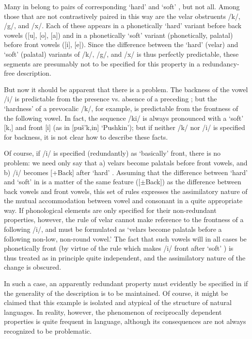 Many  in  belong to pairs of corresponding `hard' and
`soft' , but not all.  Among those that are not
contrastively paired in this way are the velar obstruents /k/, /g/,
and /x/. Each of these appears in a phonetically `hard' variant before
back vowels ([u], [o], [a]) and in a phonetically `soft' variant
(phonetically, palatal) before front vowels ([i], [e]).  Since the
difference between the `hard' (velar) and `soft' (palatal) variants of
/k/, /g/, and /x/ is thus perfectly predictable, these segments are
presumably not to be specified for this property in a redundancy-free
description.

But now it should be apparent that there is a problem.  The backness
of the vowel /i/ is predictable from the presence vs.  absence of a
preceding ; but the `hardness' of a prevocalic /k/, for
example, is predictable from the frontness of the following vowel.  In
fact, the sequence /ki/ is always pronounced with a `soft' [k,] and
front [i] (as in [puš'k,in] `Pushkin'); but if neither /k/ nor /i/
is specified for backness, it is not clear how to describe these
facts.

Of course, if /i/ is specified (redundantly) as `basically' front,
there is no problem: we need only say that a) velars become palatals
before front vowels, and b) /i/ becomes [+Back] after `hard'
.  Assuming that the difference between `hard' and `soft'
 in  is a matter of the same feature ([$\pm$Back]) as
the difference between back vowels and front vowels, this set of {rules}
expresses the assimilatory nature of the mutual accommodation between
vowel and consonant in a quite appropriate way.  If phonological
elements are only specified for their non-redundant properties,
however, the rule of velar  cannot make reference to the
frontness of a following /i/, and must be formulated as `velars become
palatals before a following non-low, non-round vowel.' The fact that
such vowels will in all cases be phonetically front (by virtue of the
rule which makes /i/ front after `soft' ) is thus treated as
in principle quite independent, and the assimilatory nature of the
{change} is obscured.

In such a case, an apparently redundant property must evidently be
specified in  if the generality of the
description is to be maintained.  Of course, it might be claimed that
this example is isolated and atypical of the structure of natural
languages.  In reality, however, the phenomenon of reciprocally
dependent properties is quite frequent in language, although its
consequences are not always recognized to be problematic.

